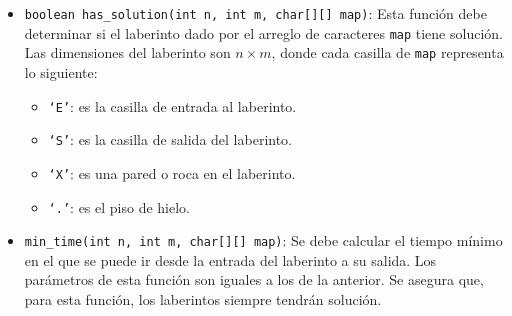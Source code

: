 \documentclass{oci}
\begin{document}
\begin{problemDescription}
\begin{itemize}
	\item \texttt{boolean has\_solution(int n, int m, char[][] map)}: Esta
	función debe determinar si el laberinto dado por el arreglo de caracteres
	\texttt{map} tiene solución. Las dimensiones del laberinto son $n\times
	m$, donde cada casilla de \texttt{map} representa lo siguiente:
	\begin{itemize}
		\item \texttt{`E'}: es la casilla de entrada al laberinto.
		\item \texttt{`S'}: es la casilla de salida del laberinto.
		\item \texttt{`X'}: es una pared o roca en el laberinto.
		\item \texttt{`.'}: es el piso de hielo.
	\end{itemize}
	\item \texttt{min\_time(int n, int m, char[][] map)}: Se debe calcular el
	tiempo mínimo en el que se puede ir desde la entrada del laberinto a su
	salida. Los parámetros de esta función son iguales a los de la anterior.
	Se asegura que, para esta función, los laberintos siempre tendrán
	solución.
\end{itemize}
\end{problemDescription}
\end{document}
